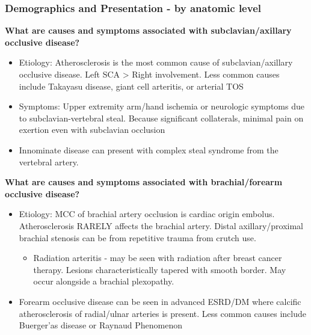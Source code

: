 \documentclass[
]{book}
\providecommand{\tightlist}{%
  \setlength{\itemsep}{0pt}\setlength{\parskip}{0pt}}
\begin{document}
\hypertarget{demographics-and-presentation---by-anatomic-level}{%
\subsubsection{Demographics and Presentation - by anatomic level}\label{demographics-and-presentation---by-anatomic-level}}

\textbf{What are causes and symptoms associated with subclavian/axillary
occlusive disease?} \citep{jacklcronenwettVascularDecisionMaking2020}

\begin{itemize}
\item
  Etiology: Atherosclerosis is the most common cause of
  subclavian/axillary occlusive disease. Left SCA \textgreater{} Right
  involvement. Less common causes include Takayasu disease, giant cell
  arteritis, or arterial TOS
\item
  Symptoms: Upper extremity arm/hand ischemia or neurologic symptoms
  due to subclavian-vertebral steal. Because significant collaterals,
  minimal pain on exertion even with subclavian occlusion
\item
  Innominate disease can present with complex steal syndrome from the
  vertebral artery.\citep{rodriguez2016}
\end{itemize}

\textbf{What are causes and symptoms associated with brachial/forearm
occlusive disease?}

\begin{itemize}
\item
  Etiology: MCC of brachial artery occlusion is cardiac origin
  embolus. Atherosclerosis RARELY affects the brachial artery. Distal
  axillary/proximal brachial stenosis can be from repetitive trauma
  from crutch use.

  \begin{itemize}
  \tightlist
  \item
    Radiation arteritis - may be seen with radiation after breast
    cancer therapy. Lesions characteristically tapered with smooth
    border. May occur alongside a brachial
    plexopathy.\citep{goldstein2010, modrall2003}
  \end{itemize}
\item
  Forearm occlusive disease can be seen in advanced ESRD/DM where
  calcific atherosclerosis of radial/ulnar arteries is present. Less
  common causes include Buerger'as disease or Raynaud Phenomenon
\end{itemize}
\end{document}
